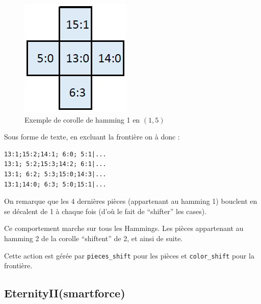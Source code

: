 \begin{exmp}
\begin{minipage}{0.24\textwidth}
\begin{figure}[H]
			\includegraphics[width=\linewidth]{images/corolle_ex_orientee_3}
			\caption{Exemple de corolle de hamming 1 en $(1,5)$}
			\label{fig:corolle_ex_orientee_3}
		\end{figure}
	\end{minipage}\hfill
		
		
	Sous forme de texte, en excluant la frontière on à donc :
	\begin{lstlisting}
13:1;15:2;14:1; 6:0; 5:1|...
13:1; 5:2;15:3;14:2; 6:1|...
13:1; 6:2; 5:3;15:0;14:3|...
13:1;14:0; 6:3; 5:0;15:1|...
	\end{lstlisting}
	
	On remarque que les 4 dernières pièces (appartenant au hamming 1) bouclent en se décalent de 1 à chaque fois (d'où le fait de \enquote{shifter} les cases).
\end{exmp}

Ce comportement marche sur tous les Hammings. Les pièces appartenant au hamming 2 de la corolle \enquote{shiftent} de 2, et ainsi de suite.

Cette action est gérée par \lstinline[language=python]|pieces_shift|  pour les pièces et \lstinline[language=python]|color_shift| pour la frontière.


\subsection{EternityII(smartforce)}

